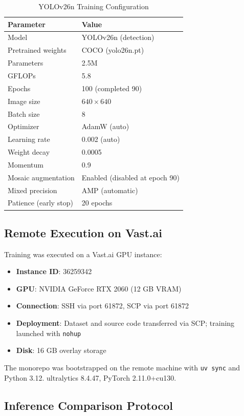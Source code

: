 \documentclass[11pt,a4paper]{article}
\begin{document}
\begin{table}[H]
\centering
\caption{YOLOv26n Training Configuration}
\begin{tabular}{@{}ll@{}}
\toprule
\textbf{Parameter} & \textbf{Value} \\
\midrule
Model & YOLOv26n (detection) \\
Pretrained weights & COCO (yolo26n.pt) \\
Parameters & 2.5M \\
GFLOPs & 5.8 \\
Epochs & 100 (completed 90) \\
Image size & $640 \times 640$ \\
Batch size & 8 \\
Optimizer & AdamW (auto) \\
Learning rate & 0.002 (auto) \\
Weight decay & 0.0005 \\
Momentum & 0.9 \\
Mosaic augmentation & Enabled (disabled at epoch 90) \\
Mixed precision & AMP (automatic) \\
Patience (early stop) & 20 epochs \\
\bottomrule
\end{tabular}
\end{table}

\subsection{Remote Execution on Vast.ai}

Training was executed on a Vast.ai GPU instance:
\begin{itemize}[nosep]
  \item \textbf{Instance ID}: 36259342
  \item \textbf{GPU}: NVIDIA GeForce RTX 2060 (12 GB VRAM)
  \item \textbf{Connection}: SSH via port 61872, SCP via port 61872
  \item \textbf{Deployment}: Dataset and source code transferred via SCP; training launched with \texttt{nohup}
  \item \textbf{Disk}: 16 GB overlay storage
\end{itemize}

The monorepo was bootstrapped on the remote machine with \texttt{uv sync} and Python 3.12. ultralytics 8.4.47, PyTorch 2.11.0+cu130.

\subsection{Inference Comparison Protocol}
\end{document}

